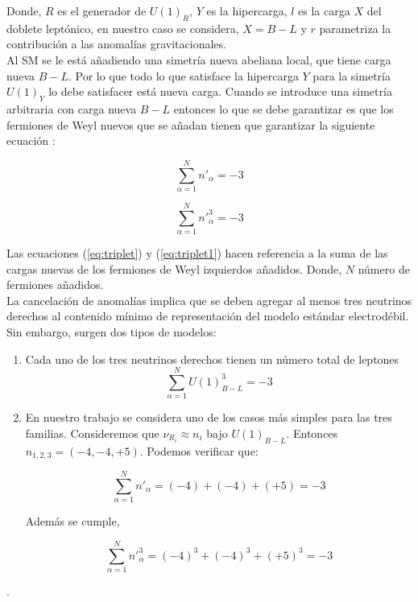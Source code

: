 \documentclass[12pt]{article}
\begin{document}
Donde, $R$ es el generador de $U(1)_R$, $Y $ es la hipercarga, $l$ es la carga $X$ del doblete leptónico, en nuestro caso se considera, $X={B-L}$ y $r$ parametriza la contribución a las anomalías gravitacionales. \\

Al SM se le está añadiendo una simetría nueva abeliana local, que tiene carga nueva ${B-L}$. Por lo que todo lo que satisface la hipercarga ${Y}$ para la simetría $U(1)_Y$ lo debe satisfacer está nueva carga. Cuando se introduce una simetría arbitraria con carga nueva ${B-L}$ entonces lo que se debe garantizar es que los fermiones de Weyl nuevos que se añadan tienen que garantizar la siguiente ecuación \cite{Restrepo}:


\begin{equation}
\label{eq:triplet}
    \sum_{\alpha=1}^N n'_{\alpha}=-3 
\end{equation}

\begin{equation}
\label{eq:triplet1}
    \sum_{\alpha=1}^N n'^{3}_{\alpha}=-3 
\end{equation}

Las ecuaciones (\ref{eq:triplet}) y (\ref{eq:triplet1}) hacen referencia a la suma de las cargas nuevas de los fermiones de Weyl izquierdos añadidos. Donde, $N$ número de fermiones añadidos. \\ 

La cancelación de anomalías implica que se deben agregar al menos tres neutrinos derechos al contenido mínimo de representación del modelo estándar electrodébil. Sin embargo, surgen dos tipos de modelos:

\begin{enumerate}
\item Cada uno de los tres neutrinos derechos tienen un número total de leptones 
\begin{equation}
\label{eq:triplet2}
    \sum_{\alpha=1}^N U(1)_{B-L}^{3}=-3 
\end{equation}
\item En nuestro trabajo se considera uno de los casos más simples para las tres familias. Consideremos que $\nu_{R_i} \approx n_i $ bajo $U(1)_{B-L}$. Entonces $n_{1,2,3}=(-4,-4,+5)$. Podemos verificar que:


\begin{equation}
\label{eq:triplet3}
    \sum_{\alpha=1}^N n'_{\alpha}=(-4) + (-4)+ (+5) = -3
\end{equation}

Además se cumple,  

\begin{equation}
\label{eq:triplet4}
    \sum_{\alpha=1}^N n'^{3}_{\alpha}=(-4)^3 + (-4)^3+ (+5)^3 = -3
\end{equation}
\end{enumerate}.
\end{document}
